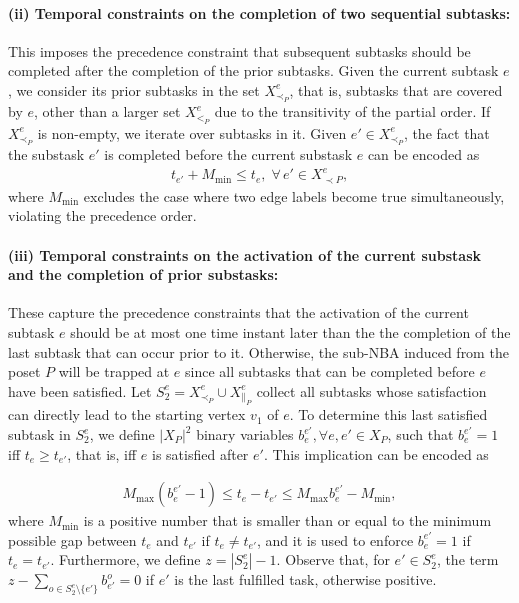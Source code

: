 \documentclass[Afour,sageh,times]{sagej}
\begin{document}
{{{\paragraph{(ii) Temporal constraints on the completion of two sequential subtasks:}\label{sec:constraintonedge}
This imposes the precedence constraint that subsequent subtasks should be completed after the completion of the prior subtasks.   Given the current subtask $e$, we consider its prior subtasks in the set $X^e_{\prec_{P}}$, that is, subtasks that are covered by $e$, other than a larger set $X^e_{<_{P}}$ due to the transitivity of the partial order.
If $X^e_{\prec_{P}}$ is non-empty, we iterate over subtasks in it.  Given $e' \in X^e_{\prec_{P}}$, the fact that the substask $e'$ is completed before the current substask $e$ can be encoded as
\begingroup\makeatletter\def\f@size{10}\check@mathfonts
\def\maketag@@@#1{\hbox{\m@th\normalsize\normalfont#1}}%
\begin{align}\label{eq:12}
  t_{e'} +  M_{\text{min}}  \leq t_e, \; \forall \, e' \in X_{\prec P}^e,
\end{align}
\endgroup
where $M_{\text{min}}$ excludes the case where two edge labels become true simultaneously, violating the precedence order.



\paragraph{(iii) Temporal constraints on  the  activation of the current substask and the completion  of prior substasks:}
These capture the precedence constraints that the activation of the current subtask $e$  should be at most one time instant later than the the completion of the last subtask that can occur prior to it. Otherwise, the sub-NBA induced from the poset $P$ will be trapped at $e$ since all subtasks that can be completed  before $e$ have been satisfied.  Let $S_2^e = X^e_{\prec_{P}} \cup X^e_{\|_{P}}$ collect all subtasks whose satisfaction can directly lead to the starting vertex $v_1$ of $e$. To determine this last satisfied subtask in $S_2^e$, we define $|X_{P}|^2$ binary variables $b_{e}^{e'}, \forall e, e' \in X_{P}$,  such that $b_{e}^{e'}=1$  iff $t_e \geq t_{e'}$, that is, iff $e$ is satisfied after $e'$. This implication can be encoded as}
\begingroup\makeatletter{}\check@mathfonts
\def\maketag@@@#1{\hbox{\m@th\normalsize\normalfont#1}}%
\begin{align}
  M_{\text{max}} (b_{e}^{e'} - 1) \leq t_e -  t_{e'} \leq M_{\text{max}} b_{e}^{e'} - M_{\text{min}},
\end{align}
  \endgroup
  where $M_{\text{min}}$ is a positive number that is smaller than or equal to the minimum possible gap between $t_e$ and $t_{e′}$ if $t_e \not= t_{e′}$, and it is used to enforce $b_{e}^{e'}=1$ if $t_e = t_{e'}$. Furthermore, we define $z = |S_2^e| -1$. Observe that, for $e' \in S_2^e $, the term $z -  \sum_{o \in S_2^e\setminus \{e'\}  } b_{e'}^o = 0$ if $e'$ is the last fulfilled task, otherwise  positive.

}}
\end{document}
